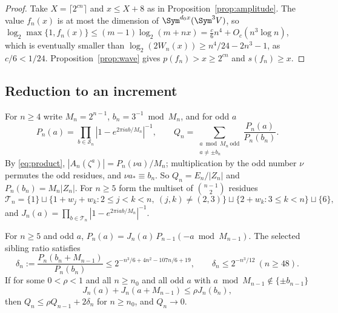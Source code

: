 \begin{proof}
Take $X=\lceil2^{cn}\rceil$ and $x\le X+8$ as in
Proposition~\ref{prop:amplitude}. The value $f_n(x)$ is at most the dimension
of $\Sym^{d_0x}(\Sym^3V)$, so
$\log_2\max\{1,f_n(x)\}\le(m-1)\log_2(m+nx)=\frac c6n^4+O_c(n^3\log n)$, which
is eventually smaller than $\log_2(2W_n(x))\ge n^4/24-2n^3-1$, as $c/6<1/24$.
Proposition~\ref{prop:wave} gives $p(f_n)>x\ge2^{cn}$ and $s(f_n)\ge x$.
\end{proof}

\subsection{Reduction to an increment}

For $n\ge4$ write $M_n=2^{n-1}$, $b_n=3^{-1}\bmod M_n$, and for odd $a$
\begin{equation}\label{eq:Pn}
 P_n(a)=\prod_{b\in\mathcal S_n}|1-e^{2\pi iab/M_n}|^{-1},\qquad
 Q_n=\sum_{\substack{a\bmod M_n\ \mathrm{odd}\\a\ne\pm b_n}}\frac{P_n(a)}{P_n(b_n)} .
\end{equation}
By \eqref{eq:product}, $|A_n(\zeta^a)|=P_n(\nu a)/M_n$; multiplication by the
odd number $\nu$ permutes the odd residues, and $\nu a_*\equiv b_n$. So
$Q_n=E_n/|Z_n|$ and $P_n(b_n)=M_n|Z_n|$. For $n\ge5$ form the multiset of
$\binom{n-1}2$ residues
\begin{equation}\label{eq:Tn}
 \mathcal T_n=\{1\}\sqcup\{1+w_j+w_k:2\le j<k<n,\ (j,k)\ne(2,3)\}
 \sqcup\{2+w_k:3\le k<n\}\sqcup\{6\},
\end{equation}
and $J_n(a)=\prod_{b\in\mathcal T_n}|1-e^{2\pi iab/M_n}|^{-1}$.

\begin{proposition}\label{prop:recursion}
For $n\ge5$ and odd $a$, $P_n(a)=J_n(a)\,P_{n-1}(-a\bmod M_{n-1})$. The selected
sibling ratio satisfies
\begin{equation}\label{eq:sibling}
 \delta_n:=\frac{P_n(b_n+M_{n-1})}{P_n(b_n)}\le2^{-n^3/6+4n^2-107n/6+19},
 \qquad\delta_n\le2^{-n^3/12}\ (n\ge48).
\end{equation}
If for some $0<\rho<1$ and all $n\ge n_0$ and all odd $a$ with
$a\bmod M_{n-1}\notin\{\pm b_{n-1}\}$
\begin{equation}\label{eq:contraction}
 J_n(a)+J_n(a+M_{n-1})\le\rho J_n(b_n),
\end{equation}
then $Q_n\le\rho Q_{n-1}+2\delta_n$ for $n\ge n_0$, and $Q_n\to0$.
\end{proposition}

